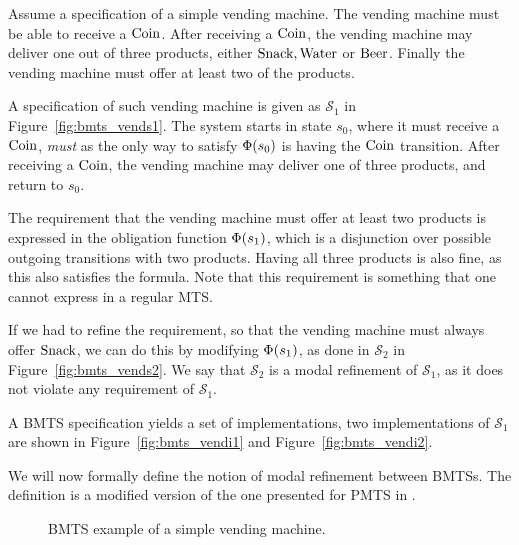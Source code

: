 \begin{example}
Assume a specification of a simple vending machine. The vending machine must be able to receive a $\text{Coin}$. After receiving a $\text{Coin}$, the vending machine may deliver one out of three products, either $\text{Snack}, \text{Water}$ or $\text{Beer}$. Finally the vending machine must offer at least two of the products.

A specification of such vending machine is given as $\mathcal{S}_1$ in Figure~\ref{fig:bmts_vends1}. The system starts in state $s_0$, where it must receive a $\text{Coin}$, \emph{must} as the only way to satisfy $\mathrm{\Phi}(s_0)$ is having the $\text{Coin}$ transition. 
After receiving a $\text{Coin}$, the vending machine may deliver one of three products, and return to $s_0$.

The requirement that the vending machine must offer at least two products is expressed in the obligation function $\mathrm{\Phi}(s_1)$, which is a disjunction over possible outgoing transitions with two products. Having all three products is also fine, as this also satisfies the formula. Note that this requirement is something that one cannot express in a regular MTS.

If we had to refine the requirement, so that the vending machine must always offer $\text{Snack}$, we can do this by modifying $\mathrm{\Phi}(s_1)$, as done in $\mathcal{S}_2$ in Figure~\ref{fig:bmts_vends2}. We say that $\mathcal{S}_2$ is a modal refinement of $\mathcal{S}_1$, as it does not violate any requirement of $\mathcal{S}_1$.

A BMTS specification yields a set of implementations, two implementations of $\mathcal{S}_1$ are shown in Figure~\ref{fig:bmts_vendi1} and Figure~\ref{fig:bmts_vendi2}.
\end{example}

We will now formally define the notion of modal refinement between BMTSs. The definition is a modified version of the one presented for PMTS in \cite{BKLMS:ATVA:11}.

\begin{figure}[h!]
	\centering
	\qquad
	\qquad
	\qquad
	\caption{BMTS example of a simple vending machine.}
\end{figure}


